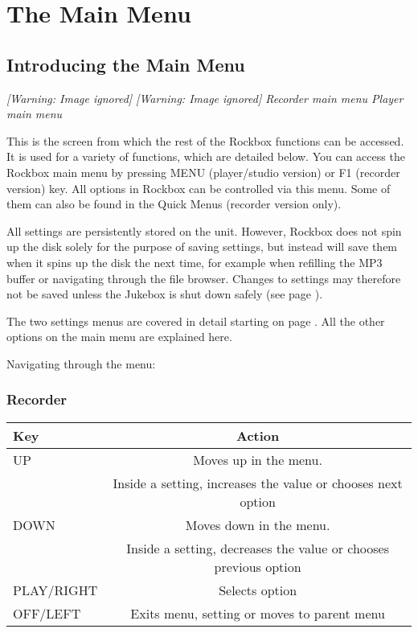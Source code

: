 \chapter{The Main Menu}

\section{Introducing the Main Menu}
{\centering\itshape
  [Warning: Image ignored] %
 \textmd{  }  [Warning: Image ignored]
 \newline
Recorder main menu  Player main menu  
\par}

This is the screen from which the rest of the
Rockbox functions can be accessed.  It is used for a variety of
functions, which are detailed below. You can access the Rockbox main
menu by pressing MENU (player/studio version) or F1 (recorder version)
key. All options in Rockbox can be controlled via this menu. Some of
them can also be found in the Quick Menus (recorder version only).

All settings are persistently stored on the unit. However, Rockbox does
not spin up the disk solely for the purpose of saving settings, but
instead will save them when it spins up the disk the next time, for
example when refilling the MP3 buffer or navigating through the file
browser. Changes to settings may therefore not be saved unless the
Jukebox is shut down safely (see page \pageref{ref:Safeshutdown}).

The two settings menus are covered in detail starting on page \pageref{ref:Part4}.
 All the other options on the main menu are explained here.

Navigating through the menu:

\subsection{Recorder}

\begin{table}[h!]
    \begin{center}
      \begin{tabular}{@{}lc@{}}\toprule
       \textbf{Key} & \textbf{Action} \\\midrule
        UP & Moves up in the menu. \\
           & Inside a setting, increases the value or chooses next option \\
        DOWN & Moves down in the menu. \\
             & Inside a setting, decreases the value or chooses previous option \\
        PLAY/RIGHT & Selects option \\
        OFF/LEFT & Exits menu, setting or moves to parent menu\\\bottomrule
      \end{tabular}
    \end{center}
\end{table}

